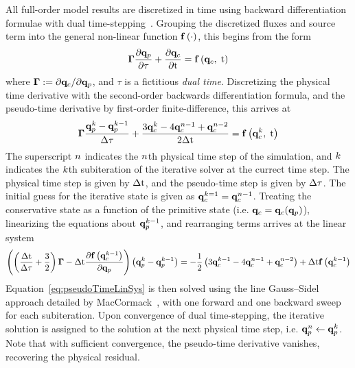All full-order model results are discretized in time using backward differentiation formulae with dual time-stepping~\cite{Pandya2003}. Grouping the discretized fluxes and source term into the general non-linear function $\mathbf{f} \left(\cdot\right)$, this begins from the form
%
\begin{equation}
	\boldsymbol{\Gamma} \frac{\partial \mathbf{q}_p}{\partial \tau} + \frac{\partial \mathbf{q}_c}{\partial \text{t}} = \mathbf{f} \left(\mathbf{q}_c, \; \text{t}\right)
\end{equation}
%
where $\boldsymbol{\Gamma} := \partial \mathbf{q}_c / \partial \mathbf{q}_p$, and $\tau$ is a fictitious \textit{dual time}. Discretizing the physical time derivative with the second-order backwards differentiation formula, and the pseudo-time derivative by first-order finite-difference, this arrives at
%
\begin{equation}
	\boldsymbol{\Gamma} \frac{\mathbf{q}_p^{k} - \mathbf{q}_p^{k - 1}}{\Delta \tau} + \frac{3 \mathbf{q}_c^{k} - 4 \mathbf{q}_c^{n - 1} + \mathbf{q}_c^{n - 2}}{2\Delta \text{t}} = \mathbf{f} \left(\mathbf{q}_c^{k}, \; \text{t}\right)
\end{equation}
%
The superscript $n$ indicates the $n$th physical time step of the simulation, and $k$ indicates the $k$th subiteration of the iterative solver at the currect time step. The physical time step is given by $\Delta \text{t}$, and the pseudo-time step is given by $\Delta \tau$. The initial guess for the iterative state is given as $\mathbf{q}_c^{k=1} = \mathbf{q}_c^{n - 1}$. Treating the conservative state as a function of the primitive state (i.e. $\mathbf{q}_c = \mathbf{q}_c(\mathbf{q}_p)$), linearizing the equations about $\mathbf{q}_p^{k - 1}$, and rearranging terms arrives at the linear system
%
\begin{equation}\label{eq:pseudoTimeLinSys}
\left(\left(\frac{\Delta \text{t}}{\Delta \tau} + \frac{3}{2}\right)\boldsymbol{\Gamma} - \Delta \text{t} \frac{\partial \mathbf{f} \left(\mathbf{q}_c^{k - 1}\right)}{\partial \mathbf{q}_p}\right) \left(\mathbf{q}_p^{k} - \mathbf{q}_p^{k - 1}\right) = - \frac{1}{2}\left(3 \mathbf{q}_c^{k-1} - 4 \mathbf{q}_c^{n - 1} + \mathbf{q}_c^{n - 2}\right) + \Delta \text{t} \mathbf{f} \left(\mathbf{q}_c^{k - 1}\right)
\end{equation}
%
Equation~\ref{eq:pseudoTimeLinSys} is then solved using the line Gauss--Sidel approach detailed by MacCormack~\cite{MacCormack1985}, with one forward and one backward sweep for each subiteration. Upon convergence of dual time-stepping, the iterative solution is assigned to the solution at the next physical time step, i.e. $\mathbf{q}_p^{n} \leftarrow \mathbf{q}_p^{k}$. Note that with sufficient convergence, the pseudo-time derivative vanishes, recovering the physical residual.

